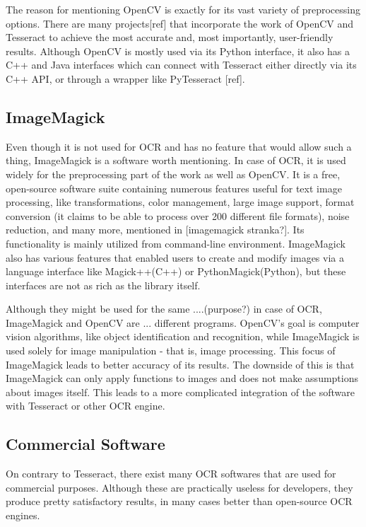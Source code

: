 The reason for mentioning OpenCV is exactly for its vast variety of preprocessing options. There are many projects[ref] that incorporate the work of OpenCV and Tesseract to achieve the most accurate and, most importantly, user-friendly results. Although OpenCV is mostly used via its Python interface, it also has a C++ and Java interfaces which can connect with Tesseract either directly via its C++ API, or through a wrapper like PyTesseract [ref].

\subsection{ImageMagick}

Even though it is not used for OCR and has no feature that would allow such a thing, ImageMagick is a software worth mentioning. In case of OCR, it is used widely for the preprocessing part of the work as well as OpenCV. It is a free, open-source software suite containing numerous features useful for text image processing, like transformations, color management, large image support, format conversion (it claims to be able to process over 200 different file formats), noise reduction,  and many more, mentioned in [imagemagick stranka?]. Its functionality is mainly utilized from command-line environment. ImageMagick also has various features that enabled users to create and modify images via a language interface like Magick++(C++) or PythonMagick(Python), but these interfaces are not as rich as the library itself. 

Although they might be used for the same ....(purpose?) in case of OCR, ImageMagick and OpenCV are ... different programs. OpenCV's goal is computer vision algorithms, like object identification and recognition, while ImageMagick is used solely for image manipulation - that is, image processing. This focus of ImageMagick leads to better accuracy of its results. The downside of this is that ImageMagick can only apply functions to images and does not make assumptions about images itself. This leads to a more complicated integration of the software with Tesseract or other OCR engine.

\subsection{Commercial Software}

On contrary to Tesseract, there exist many OCR softwares that are used for commercial purposes. Although these are practically useless for developers, they produce pretty satisfactory results, in many cases better than open-source OCR engines.

